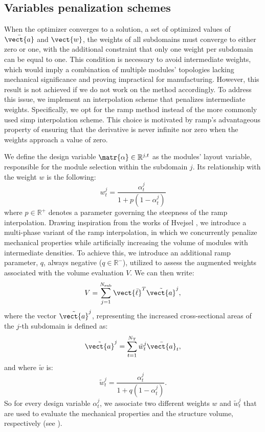 \subsection{Variables penalization schemes}
When the optimizer converges to a solution, \ie a set of optimized values of $\bar{\vect{a}}$ and $\vect{w}$, the weights of all subdomains must converge to either zero or one, with the additional constraint that only one weight per subdomain can be equal to one. This condition is necessary to avoid intermediate weights, which would imply a combination of multiple modules' topologies lacking mechanical significance and proving impractical for manufacturing. However, this result is not achieved if we do not work on the method accordingly. To address this issue, we implement an interpolation scheme that penalizes intermediate weights. Specifically, we opt for the \gls{ramp} method  instead of the more commonly used \gls{simp} interpolation scheme. This choice is motivated by \gls{ramp}'s advantageous property of ensuring that the derivative is never infinite nor zero when the weights approach a value of zero.

We define the design variable $\matr{\alpha}\in\mathbb{R}^{j,t}$ as the modules' layout variable, responsible for the module selection within the subdomain $j$. Its relationship with the weight $w$ is the following:
\begin{equation}
    w_t^j = \frac{\alpha_t^j}{1+p(1-\alpha_t^j)}    
\end{equation}
where $p \in \mathbb{R}^+$ denotes a parameter governing the steepness of the \gls{ramp} interpolation. Drawing inspiration from the works of Hvejsel \etal {}, we introduce a multi-phase variant of the \gls{ramp} interpolation, in which we concurrently penalize mechanical properties while artificially increasing the volume of modules with intermediate densities. To achieve this, we introduce an additional \gls{ramp} parameter, $q$, always negative ($q \in \mathbb{R}^-$), utilized to assess the augmented weights associated with the volume evaluation $V$. We can then write:
\begin{equation}
    V = \sum_{j=1}^{N_{\text{sub}}}\vect{\bar{\ell}}^T\tilde{\vect{a}}^j,
\end{equation}
where the vector $\tilde{\vect{a}}^j$, representing the increased cross-sectional areas of the $j$-th subdomain is defined as:
\begin{equation}
    \tilde{\vect{a}}^j = \sum_{t=1}^{N_\text{T}} \tilde{w}_t^j \bar{\vect{a}}_t, 
\end{equation}
and where $\tilde{w}$ is:
\begin{equation}
    \tilde{w}_t^j = \frac{\alpha_t^j}{1+q(1-\alpha_t^j)}.    
\end{equation}
So for every design variable $\alpha_t^j$, we associate two different weights $w$ and $\tilde{w}_t^j    $ that are used to evaluate the mechanical properties and the structure volume, respectively (see ).


